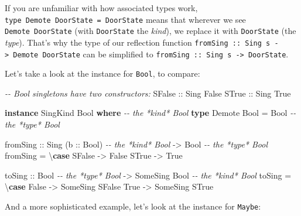 \documentclass[]{article}
\newenvironment{Shaded}{}{}
\newcommand{\CommentTok}[1]{\textcolor[rgb]{0.38,0.63,0.69}{\textit{#1}}}
\newcommand{\DataTypeTok}[1]{\textcolor[rgb]{0.56,0.13,0.00}{#1}}
\newcommand{\KeywordTok}[1]{\textcolor[rgb]{0.00,0.44,0.13}{\textbf{#1}}}
\newcommand{\NormalTok}[1]{#1}
\newcommand{\OtherTok}[1]{\textcolor[rgb]{0.00,0.44,0.13}{#1}}
\begin{document}
If you are unfamiliar with how associated types work,
\texttt{type\ Demote\ DoorState\ =\ DoorState} means that wherever we see
\texttt{Demote\ DoorState} (with \texttt{DoorState} the \emph{kind}), we replace
it with \texttt{DoorState} (the \emph{type}). That's why the type of our
reflection function
\texttt{fromSing\ ::\ Sing\ s\ -\textgreater{}\ Demote\ DoorState} can be
simplified to \texttt{fromSing\ ::\ Sing\ s\ -\textgreater{}\ DoorState}.

Let's take a look at the instance for \texttt{Bool}, to compare:

\begin{Shaded}
\begin{Highlighting}[]
\CommentTok{{-}{-} Bool singletons have two constructors:}
\DataTypeTok{SFalse}\OtherTok{ ::} \DataTypeTok{Sing} \DataTypeTok{\textquotesingle{}False}
\DataTypeTok{STrue}\OtherTok{  ::} \DataTypeTok{Sing} \DataTypeTok{\textquotesingle{}True}

\KeywordTok{instance} \DataTypeTok{SingKind} \DataTypeTok{Bool} \KeywordTok{where}    \CommentTok{{-}{-} the *kind* Bool}
    \KeywordTok{type} \DataTypeTok{Demote} \DataTypeTok{Bool} \OtherTok{=} \DataTypeTok{Bool}     \CommentTok{{-}{-} the *type* Bool}

\NormalTok{    fromSing}
\OtherTok{        ::} \DataTypeTok{Sing}\NormalTok{ (}\OtherTok{b ::} \DataTypeTok{Bool}\NormalTok{)        }\CommentTok{{-}{-} the *kind* Bool}
        \OtherTok{{-}>} \DataTypeTok{Bool}                    \CommentTok{{-}{-} the *type* Bool}
\NormalTok{    fromSing }\OtherTok{=}\NormalTok{ \textbackslash{}}\KeywordTok{case}
        \DataTypeTok{SFalse} \OtherTok{{-}>} \DataTypeTok{False}
        \DataTypeTok{STrue}  \OtherTok{{-}>} \DataTypeTok{True}

\NormalTok{    toSing}
\OtherTok{        ::} \DataTypeTok{Bool}                    \CommentTok{{-}{-} the *type* Bool}
        \OtherTok{{-}>} \DataTypeTok{SomeSing} \DataTypeTok{Bool}           \CommentTok{{-}{-} the *kind* Bool}
\NormalTok{    toSing }\OtherTok{=}\NormalTok{ \textbackslash{}}\KeywordTok{case}
        \DataTypeTok{False} \OtherTok{{-}>} \DataTypeTok{SomeSing} \DataTypeTok{SFalse}
        \DataTypeTok{True}  \OtherTok{{-}>} \DataTypeTok{SomeSing} \DataTypeTok{STrue}
\end{Highlighting}
\end{Shaded}

And a more sophisticated example, let's look at the instance for \texttt{Maybe}:
\end{document}
